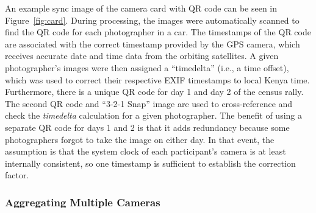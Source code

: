 \noindent An example sync image of the camera card with QR code can be seen in Figure~\ref{fig:card}.  During processing, the images were automatically scanned to find the QR code for each photographer in a car.  The timestamps of the QR code are associated with the correct timestamp provided by the GPS camera, which receives accurate date and time data from the orbiting satellites.  A given photographer's images were then assigned a ``timedelta'' (i.e., a time offset), which was used to correct their respective EXIF timestamps to local Kenya time.  Furthermore, there is a unique QR code for day 1 and day 2 of the census rally.  The second QR code and ``3-2-1 Snap'' image are used to cross-reference and check the \textit{timedelta} calculation for a given photographer.  The benefit of using a separate QR code for days 1 and 2 is that it adds redundancy because some photographers forgot to take the image on either day.  In that event, the assumption is that the system clock of each participant's camera is at least internally consistent, so one timestamp is sufficient to establish the correction factor.

\subsubsection{Aggregating Multiple Cameras}

